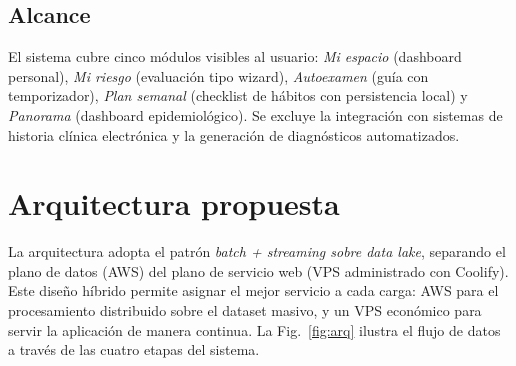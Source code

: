 \documentclass[conference,a4paper,10pt]{IEEEtran}
\begin{document}
\subsection{Alcance}
El sistema cubre cinco módulos visibles al usuario: \emph{Mi espacio}
(dashboard personal), \emph{Mi riesgo} (evaluación tipo wizard),
\emph{Autoexamen} (guía con temporizador), \emph{Plan semanal} (checklist
de hábitos con persistencia local) y \emph{Panorama} (dashboard
epidemiológico). Se excluye la integración con sistemas de historia
clínica electrónica y la generación de diagnósticos automatizados.

\section{Arquitectura propuesta}\label{sec:arq}
La arquitectura adopta el patrón \emph{batch + streaming sobre data
lake}, separando el plano de datos (AWS) del plano de servicio web (VPS
administrado con Coolify). Este diseño híbrido permite asignar el mejor
servicio a cada carga: AWS para el procesamiento distribuido sobre el
dataset masivo, y un VPS económico para servir la aplicación de manera
continua. La Fig.~\ref{fig:arq} ilustra el flujo de datos a través de las
cuatro etapas del sistema.
\end{document}
